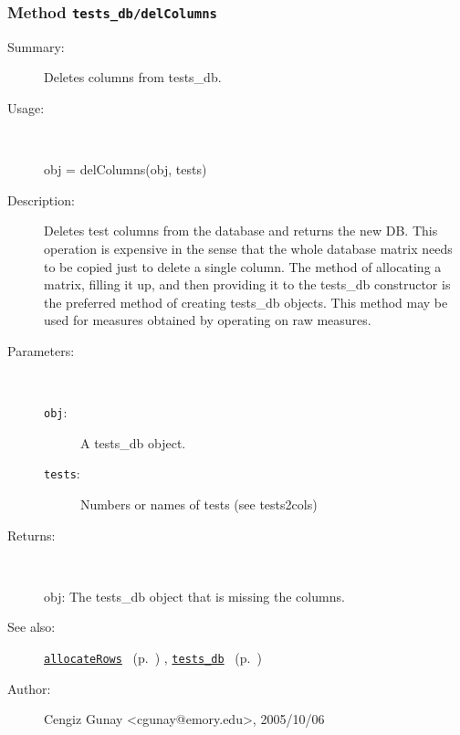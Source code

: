 \subsubsection[Method \texttt{delColumns}]{Method \texttt{tests\_db/delColumns}}%
%
\label{ref_tests_db__delColumns}%
\hypertarget{ref_tests_db__delColumns}{}%
\begin{description}
\item[Summary:]Deletes columns from tests\_db.
%
\item[Usage:]~%
\begin{lyxcode}%
obj = delColumns(obj, tests)
%
\end{lyxcode}%
%
\item[Description:]%
Deletes test columns from the database and returns the new DB.
   This operation is expensive in the sense that the whole database matrix
   needs to be copied just to delete a 
   single column. The method of allocating a matrix, filling it up, and
   then providing it to the tests\_db constructor is the preferred method 
   of creating tests\_db objects. This method may be used for 
   measures obtained by operating on raw measures.
\item[Parameters:]~
\begin{description}%
\item[\texttt{obj}:]
 A tests\_db object.
\item[\texttt{tests}:]
 Numbers or names of tests (see tests2cols)
\end{description}%
%
\item[Returns:
]~

	obj: The tests\_db object that is missing the columns.
%
%
\item[See also:]%
\hyperlink{ref_allocateRows}{\texttt{allocateRows}}%
\ (p.~\pageref{ref_allocateRows})%
%
, \hyperlink{ref_tests_db}{\texttt{tests\_db}}%
\ (p.~\pageref{ref_tests_db})%
%
%
\item[Author:]%
Cengiz Gunay <cgunay@emory.edu>, 2005/10/06
%
\end{description}
\methodline%
